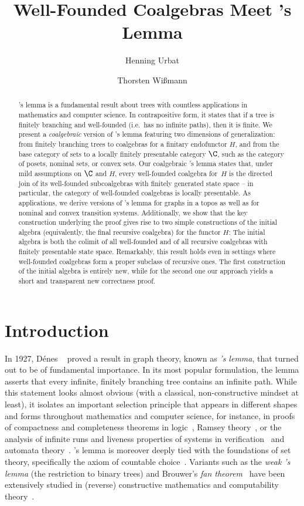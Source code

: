 \documentclass[a4paper,UKenglish, autoref, numberwithinsect, final]{lipics-v2021}
\title{Well-Founded Coalgebras Meet \Konig's Lemma} %
\author{Henning Urbat}{Friedrich-Alexander-Universität Erlangen-Nürnberg, Germany\and\url{https://www8.cs.fau.de/people/henning-urbat/}}{henning.urbat@fau.de}{https://orcid.org/0000-0002-3265-7168}{Deutsche Forschungsgemeinschaft (DFG, German
  Research Foundation) -- project numbers 470467389 and 569130867.}
\author{Thorsten Wißmann}{%
Friedrich-Alexander-Universität Erlangen-Nürnberg, Germany\and
\url{https://thorsten-wissmann.de}}{thorsten.wissmann@fau.de}{https://orcid.org/0000-0001-8993-6486}{%
%
}
\numberwithin{equation}{section}
\theoremstyle{plain}
\theoremstyle{definition}
\begin{document}
\maketitle

%
\begin{abstract}
\Konig's lemma is a fundamental result about trees with countless applications in mathematics and computer science. In contrapositive form, it states that if a tree is finitely branching and well-founded (i.e.\ has no infinite paths), then it is finite. We present a \emph{coalgebraic} version of \Konig's lemma featuring two dimensions of generalization: from finitely branching trees to coalgebras for a finitary endofunctor $H$, and from the base category of sets to a locally finitely presentable category $\C$, such as the category of posets, nominal sets, or convex sets. Our coalgebraic \Konig's lemma states that, under mild assumptions on $\C$ and $H$, every well-founded coalgebra for~$H$ is the directed join of its well-founded subcoalgebras with finitely generated state space -- in particular, the category of well-founded coalgebras is locally presentable. As applications, we derive versions of \Konig's lemma for graphs in a topos as well as for nominal and convex transition systems. Additionally, we show that the key construction underlying the proof gives rise to two simple constructions of the initial algebra (equivalently, the final recursive coalgebra) for the functor $H$: The initial algebra is both the colimit of all well-founded and of all recursive coalgebras with finitely presentable state space. Remarkably, this result holds even in settings where well-founded coalgebras form a proper subclass of recursive ones. The first construction of the initial algebra is entirely new, while for the second one our approach yields a short and transparent new correctness proof.
\end{abstract}

%

\section{Introduction}
In 1927, Dénes \Konig~\cite{konig1927} proved a result in graph theory, known as \emph{\Konig's lemma}, that turned out to be of fundamental importance. In its most popular formulation, the lemma asserts that every infinite, finitely branching tree contains an infinite path. While this statement looks almost obvious (with a classical, non-constructive mindset at least), it isolates an important selection principle that appears in different shapes and forms throughout mathematics and computer science, for instance, in proofs of compactness and completeness theorems in logic~\cite{teller89}, Ramsey theory~\cite{szekely23}, or the analysis of infinite runs and liveness properties of systems in verification~\cite{brv04} and automata theory~\cite{gmms14,isb16}. \Konig's lemma is moreover deeply tied with the foundations of set theory, specifically the axiom of countable choice~\cite{hr98,jech02}. Variants such as the \emph{weak \Konig's lemma} (the restriction to binary trees) and Brouwer's \emph{fan theorem}~\cite{brouwer27} have been extensively studied in (reverse) constructive mathematics and computability theory~\cite{di21,hirschfeldt14}.
\end{document}
